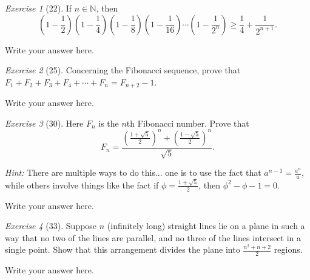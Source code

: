 \documentclass[12pt]{amsart}
\makeatletter
\theoremstyle{remark}
\newtheorem*{exercise}{Exercise}%
\def\NN{\ensuremath{\mathbb N}}
\renewenvironment{proof}[1][\proofname]{\par\doublespacing
  \pushQED{\qed}%
  \normalfont \topsep6\p@\@plus6\p@\relax
  \list{}{%
    \settowidth{\leftmargin}{\itshape\proofname:\hskip\labelsep}%
    \setlength{\labelwidth}{0pt}%
    \setlength{\itemindent}{-\leftmargin}%
  }%
  \item[\hskip\labelsep\itshape#1\@addpunct{:}]\ignorespaces
}{%
  \popQED\endlist\@endpefalse
  \singlespacing
}
\theoremstyle{mycomment}
\makeatother
\begin{document}
\begin{exercise}[22] If $n\in\NN$, then $$\left(1-\frac{1}{2}\right)\left(1-\frac{1}{4}\right)\left(1-\frac{1}{8}\right)\left(1-\frac{1}{16}\right)\cdots\left(1-\frac{1}{2^{n}}\right)\ge \frac{1}{4}+\frac{1}{2^{n+1}}.$$
\begin{proof}
Write your answer here.
\end{proof}
\end{exercise}

\begin{exercise}[25] Concerning the Fibonacci sequence, prove that $F_{1}+F_{2}+F_{3}+F_{4}+\cdots+F_{n}=F_{n+2}-1$.
\begin{proof}
Write your answer here.
\end{proof}
\end{exercise}


\begin{exercise}[30] Here $F_{n}$ is the $n$th Fibonacci number. Prove that $$F_{n}=\frac{\left(\frac{1+\sqrt{5}}{2}\right)^{n}+\left(\frac{1-\sqrt{5}}{2}\right)^{n}}{\sqrt{5}}.$$

\emph{Hint:} There are multiple ways to do this... one is to use the fact that $a^{n-1}=\frac{a^{n}}{a}$, while others involve things like the fact if $\phi=\frac{1+\sqrt{5}}{2}$, then $\phi^{2}-\phi-1=0$.
\begin{proof}
Write your answer here.
\end{proof}
\end{exercise}

\begin{exercise}[33] Suppose $n$ (infinitely long) straight lines lie on a plane in such a way that no two of the lines are parallel, and no three of the lines intersect in a single point. Show that this arrangement divides the plane into $\frac{n^{2}+n+2}{2}$ regions.
\begin{proof}
Write your answer here.
\end{proof}
\end{exercise}
\end{document}
